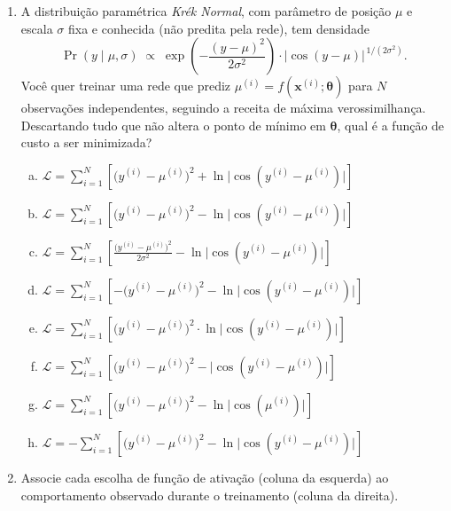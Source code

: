 \documentclass{dlproblemset}
\begin{document}
\begin{enumerate}[1)]
    \item A distribuição paramétrica \textit{Krék Normal}, com parâmetro de posição $\mu$ e escala $\sigma$ fixa e conhecida (não predita pela rede), tem densidade
    \[
    \Pr(y \mid \mu, \sigma) \;\propto\;
    \exp\!\left(-\frac{(y - \mu)^2}{2\sigma^2}\right) \cdot
    \bigl|\cos(y - \mu)\bigr|^{\,1/(2\sigma^2)} .
    \]
    Você quer treinar uma rede que prediz $\mu^{(i)} = f(\mathbf{x}^{(i)}; \boldsymbol{\theta})$ para $N$ observações independentes, seguindo a receita de máxima verossimilhança. Descartando tudo que não altera o ponto de mínimo em $\boldsymbol{\theta}$, qual é a função de custo a ser minimizada?

    \begin{enumerate}[(a)]
        \item $\mathcal{L} = \displaystyle\sum_{i=1}^{N} \left[ \bigl(y^{(i)} - \mu^{(i)}\bigr)^2 + \ln\bigl|\cos(y^{(i)} - \mu^{(i)})\bigr| \right]$
        \item $\mathcal{L} = \displaystyle\sum_{i=1}^{N} \left[ \bigl(y^{(i)} - \mu^{(i)}\bigr)^2 - \ln\bigl|\cos(y^{(i)} - \mu^{(i)})\bigr| \right]$
        \item $\mathcal{L} = \displaystyle\sum_{i=1}^{N} \left[ \frac{\bigl(y^{(i)} - \mu^{(i)}\bigr)^2}{2\sigma^2} - \ln\bigl|\cos(y^{(i)} - \mu^{(i)})\bigr| \right]$
        \item $\mathcal{L} = \displaystyle\sum_{i=1}^{N} \left[ -\bigl(y^{(i)} - \mu^{(i)}\bigr)^2 - \ln\bigl|\cos(y^{(i)} - \mu^{(i)})\bigr| \right]$
        \item $\mathcal{L} = \displaystyle\sum_{i=1}^{N} \left[ \bigl(y^{(i)} - \mu^{(i)}\bigr)^2 \cdot \ln\bigl|\cos(y^{(i)} - \mu^{(i)})\bigr| \right]$
        \item $\mathcal{L} = \displaystyle\sum_{i=1}^{N} \left[ \bigl(y^{(i)} - \mu^{(i)}\bigr)^2 - \bigl|\cos(y^{(i)} - \mu^{(i)})\bigr| \right]$
        \item $\mathcal{L} = \displaystyle\sum_{i=1}^{N} \left[ \bigl(y^{(i)} - \mu^{(i)}\bigr)^2 - \ln\bigl|\cos(\mu^{(i)})\bigr| \right]$
        \item $\mathcal{L} = -\displaystyle\sum_{i=1}^{N} \left[ \bigl(y^{(i)} - \mu^{(i)}\bigr)^2 - \ln\bigl|\cos(y^{(i)} - \mu^{(i)})\bigr| \right]$
    \end{enumerate}

    \item Associe cada escolha de função de ativação (coluna da esquerda) ao comportamento observado durante o treinamento (coluna da direita).


\end{enumerate}
\end{document}
